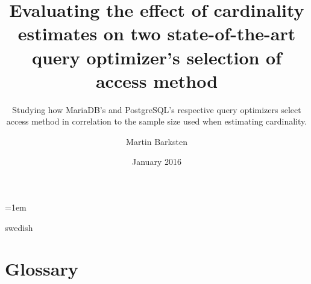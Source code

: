 \documentclass[a4paper,11pt]{kth-mag}
\title{Evaluating the effect of cardinality estimates on two state-of-the-art
  query optimizer's selection of access method}
\subtitle{Studying how MariaDB's and PostgreSQL's respective query optimizers
  select access method in correlation to the sample size used when estimating cardinality.}
\author{Martin Barksten}
\date{January 2016}
\begin{document}
\lstset{basicstyle=\ttfamily,breaklines=true}
\lstset{frame=lines}
\emergencystretch=1em
\pgfplotsset{width=10cm, compat=1.9}
\tabulinesep=1.2mm

\makeatletter
\g@addto@macro\@floatboxreset\centering
\makeatother

\newcommand{\json}[5]{
  \inputminted[breaklines, breakanywhere, fontsize=\footnotesize]{json}{#1}
  \captionof{listing}{The output when testing #2 with query #3, a sample size of
  #4 and #5 repetitions.}
}
\newcommand{\clj}[1]{\texttt{#1}}
\newcommand{\sql}[1]{\texttt{#1}}
\newenvironment{indexgraph}{
  \begin{tikzpicture}[scale=0.8]
    \begin{axis}[
      ybar,
      legend style={at={(0.5,-0.15)},
        anchor=north,legend columns=-1},
      symbolic x coords={ct,t,mt,mm,book,cmt,cmm,est,resamb},
      nodes near coords,
      ylabel={\#access methods},
      ytick=\empty,
      xtick=data]
} {
  \legend{MariaDB, PostgreSQL}
\end{axis}
\end{tikzpicture}
}

\newenvironment{indexplot}{
\begin{tikzpicture}[scale=0.8]
  \begin{axis}[
    ylabel={\#relations with varying access methods},
    xlabel={target statistic},
    legend style={at={(0.5,-0.2)},
      anchor=north,legend columns=-1},
    xtick={0,1,2},
    ytick={1,2,3,4,5},
    xticklabels={$1$, $d$, $2d$},
    domain=0:2]
}{
  \legend{PostgreSQL, MariaDB}
\end{axis}
\end{tikzpicture}
}

\frontmatter
\pagestyle{empty}
\removepagenumbers{}
\maketitle
{}
\begin{abstract}
    
\end{abstract}
\clearpage
\begin{foreignabstract}{swedish}
    
\end{foreignabstract}
\clearpage
\tableofcontents*
\clearpage
\listoffigures
\mainmatter{}
\pagestyle{newchap}

\chapter*{Glossary}\label{chap:glossary}
    
\end{document}
